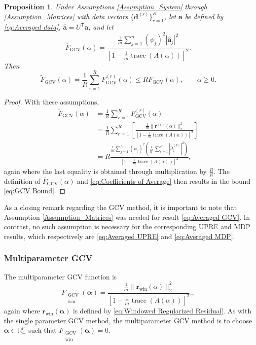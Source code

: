 \documentclass[12pt]{article}
\newcommand{\mA}{m}	%
\newcommand{\aVec}{\mathbf{a}}	%
\newcommand{\dVec}{\mathbf{d}}	%
\newcommand{\rVec}{\mathbf{r}}	%
\newcommand{\trans}[1]{{#1}^\mathsf{T}}	%
\DeclareMathOperator{\trace}{trace}		%
\newcommand{\dft}[1]{\widehat{#1}}	%
\newcommand{\regparam}{\alpha}  %
\newcommand{\regparamVec}{\bm{\regparam}}   %
\newcommand{\mfilt}{\psi}
\newcommand{\A}{A(\regparam)}	%
\newcommand{\G}{F_{\text{GCV}}}	%
\newcommand{\GAvg}{\overline{F}_{\text{GCV}}}	%
\newcommand{\GWin}{F_{\substack{\text{GCV} \\ \text{win}}}}	%
\newcommand{\GBig}{\widetilde{F}_{\text{GCV}}}	%
\newtheorem{proposition}{Proposition}[section]
\begin{document}
\begin{proposition}
Under Assumptions \ref{Assumption_System} through \ref{Assumption_Matrices} with data vectors $\{\dVec^{(r)}\}_{r=1}^R$, let $\aVec$ be defined by \eqref{eq:Averaged data}, $\dft{\aVec} = \trans{U}\aVec$, and let
\begin{equation}
\label{eq:GCV of Average}
\GAvg(\regparam) = \frac{\frac{1}{\mA}\sum_{j=1}^{n} \left(\mfilt_j\right)^2|\dft{\aVec}_j|^2}{\left[1 - \frac{1}{\mA}\trace\left(\A\right)\right]^2}.
\end{equation}
Then
\begin{equation}
\label{eq:GCV Bound}
\GBig(\regparam) = \frac{1}{R} \sum_{r=1}^R \G^{(r)}(\regparam) \leq R \GAvg(\regparam), \qquad \regparam \geq 0.
\end{equation}
\end{proposition}

\begin{proof}
With these assumptions,
\begin{align}
    \GBig(\regparam) &= \frac{1}{R} \sum_{r=1}^R \G^{(r)}(\regparam) \\
    &= \frac{1}{R}\sum_{r=1}^R \left[\frac{\frac{1}{\mA}\|\rVec^{(r)}(\regparam)\|_2^2}{\left[1 - \frac{1}{\mA}\trace\left(\A\right)\right]^2}\right] \\
    &= R\frac{\frac{1}{\mA}\sum_{j=1}^{n} \left(\mfilt_j\right)^2\left(\frac{1}{R^2} \sum_{r=1}^R \left|\dft{d}_j^{(r)}\right|^2\right)}{\left[1 - \frac{1}{\mA}\trace\left(\A\right)\right]^2},
\end{align}
again where the last equality is obtained through multiplication by $\frac{R}{R}$. The definition of $\GAvg(\regparam)$ and \eqref{eq:Coefficients of Average} then results in the bound \eqref{eq:GCV Bound}.
\end{proof}
\noindent As a closing remark regarding the GCV method, it is important to note that Assumption \ref{Assumption_Matrices} was needed for result \eqref{eq:Averaged GCV}. In contrast, no such assumption is necessary for the corresponding UPRE and MDP results, which respectively are \eqref{eq:Averaged UPRE} and \eqref{eq:Averaged MDP}.

\subsubsection{Multiparameter GCV} \label{sec:Multiparameter GCV}
The multiparameter GCV function is
\begin{equation}
\label{eq:Windowed GCV}
    \GWin(\regparamVec) = \frac{\frac{1}{\mA}\|\rVec_{\text{win}}(\regparam)\|_2^2}{\left[1 - \frac{1}{\mA}\trace(\A)\right]^2}.,
\end{equation}
again where $\rVec_\text{win}(\regparamVec)$ is defined by \eqref{eq:Windowed Regularized Residual}. As with the single parameter GCV method, the multiparameter GCV method is to choose $\regparamVec \in \mathbb{R}_+^p$ such that $\GWin(\regparamVec) = 0$.
\end{document}
